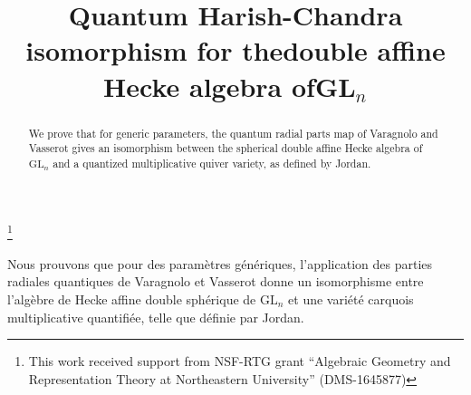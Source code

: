 \documentclass[JEP,XML,SOM,Unicode,published]{cedram}
\theoremstyle{definition}
\begin{document}
\frontmatter

\title[Quantum Harish-Chandra isomorphism for $\mathrm{GL}_n$ DAHA]{Quantum Harish-Chandra isomorphism for the\nobreakspace double affine Hecke algebra of\nobreakspace GL$_n$}

\author[\initial{J.} \middlename{J.} \lastname{Wen}]{  }
\address{Fakultät für Mathematik, Universität Wien,\\
Oskar-Morgenstern-Platz 1, 1090 Vienna, Austria}

\thanks{This work received support from NSF-RTG grant ``Algebraic Geometry and Representation Theory at Northeastern University'' (DMS-1645877)}


\begin{abstract}
We prove that for generic parameters, the quantum radial parts map of Varagnolo and Vasserot gives an isomorphism between the spherical double affine Hecke algebra of $\mathrm{GL}_n$ and a quantized multiplicative quiver variety, as defined by Jordan.
\end{abstract}



\begin{altabstract}
Nous prouvons que pour des paramètres génériques, l'application des parties radiales quantiques de Varagnolo et Vasserot donne un isomorphisme entre l'algèbre de Hecke affine double sphérique de $\mathrm{GL}_n$ et une variété carquois multiplicative quantifiée, telle que définie par Jordan.
\end{altabstract}

\maketitle
\vspace*{-\baselineskip}
\tableofcontents
\mainmatter
\end{document}
